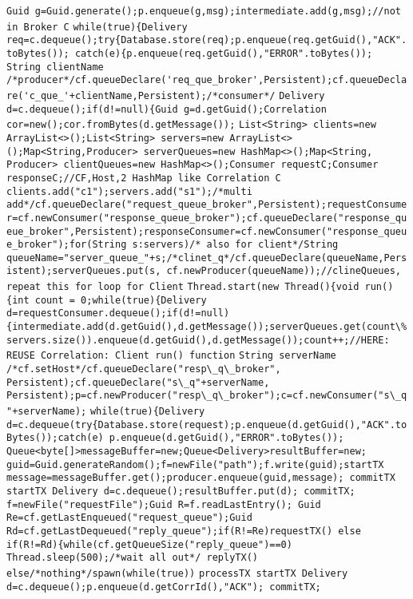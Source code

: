 \lstinline{Guid g=Guid.generate();p.enqueue(g,msg);intermediate.add(g,msg);//not in Broker C}
\lstinline{while(true){Delivery req=c.dequeue();try{Database.store(req);p.enqueue(req.getGuid(),"ACK".toBytes()); catch(e){p.enqueue(req.getGuid(),"ERROR".toBytes());}
%
%
%
\bluetext{+}
\lstinline{String clientName}
\bluetext{+}
\lstinline{/*producer*/cf.queueDeclare('req_que_broker',Persistent);cf.queueDeclare('c_que_'+clientName,Persistent);/*consumer*/}
\lstinline{Delivery d=c.dequeue();if(d!=null){Guid g=d.getGuid();Correlation cor=new();cor.fromBytes(d.getMessage());}
\bluetext{+}
\lstinline{List<String> clients=new ArrayList<>();List<String> servers=new ArrayList<>();Map<String,Producer> serverQueues=new HashMap<>();Map<String, Producer> clientQueues=new HashMap<>();Consumer requestC;Consumer responseC;//CF,Host,2 HashMap like Correlation C}
\lstinline{clients.add("c1");servers.add("s1");/*multi add*/cf.queueDeclare("request_queue_broker",Persistent);requestConsumer=cf.newConsumer("response_queue_broker");cf.queueDeclare("response_queue_broker",Persistent);responseConsumer=cf.newConsumer("response_queue_broker");for(String s:servers)/* also for client*/String queueName="server_queue_"+s;/*clinet_q*/cf.queueDeclare(queueName,Persistent);serverQueues.put(s, cf.newProducer(queueName));//clineQueues, repeat this for loop for Client}
\lstinline{Thread.start(new Thread(){void run(){int count = 0;while(true){Delivery d=requestConsumer.dequeue();if(d!=null){intermediate.add(d.getGuid(),d.getMessage());serverQueues.get(count\%servers.size()).enqueue(d.getGuid(),d.getMessage());count++;//HERE: REUSE Correlation: Client run() function}
\bluetext{+}
\lstinline{String serverName}
\lstinline{/*cf.setHost*/cf.queueDeclare("resp\_q\_broker", Persistent);cf.queueDeclare("s\_q"+serverName, Persistent);p=cf.newProducer("resp\_q\_broker");c=cf.newConsumer("s\_q"+serverName);}
\lstinline{while(true){Delivery d=c.dequeue(try{Database.store(request);p.enqueue(d.getGuid(),"ACK".toBytes());catch(e) p.enqueue(d.getGuid(),"ERROR".toBytes());}
%
%
%
\bluetext{+}
\lstinline{Queue<byte[]>messageBuffer=new;Queue<Delivery>resultBuffer=new;}
\lstinline{guid=Guid.generateRandom();f=newFile("path");f.write(guid);startTX message=messageBuffer.get();producer.enqueue(guid,message); commitTX}
\lstinline{startTX Delivery d=c.dequeue();resultBuffer.put(d); commitTX;}
\lstinline{f=newFile("requestFile");Guid R=f.readLastEntry(); Guid Re=cf.getLastEnqueued("request_queue");Guid Rd=cf.getLastDequeued("reply_queue");if(R!=Re)requestTX() else if(R!=Rd){while(cf.getQueueSize("reply_queue")==0) Thread.sleep(500);/*wait all out*/ replyTX() else/*nothing*/spawn(while(true))}
\lstinline{processTX startTX Delivery d=c.dequeue();p.enqueue(d.getCorrId(),"ACK"); commitTX;}